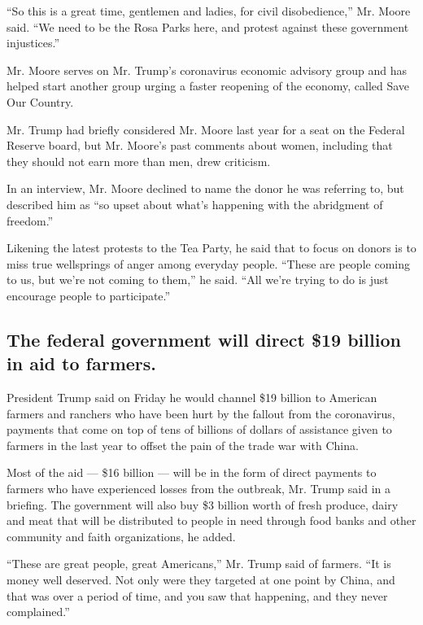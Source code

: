 ``So this is a great time, gentlemen and ladies, for civil
disobedience,'' Mr. Moore said. ``We need to be the Rosa Parks here, and
protest against these government injustices.''

Mr. Moore serves on Mr. Trump's coronavirus economic advisory group and
has helped start another group urging a faster reopening of the economy,
called Save Our Country.

Mr. Trump had briefly considered Mr. Moore last year for a seat on the
Federal Reserve board, but Mr. Moore's past comments about women,
including that they should not earn more than men, drew criticism.

In an interview, Mr. Moore declined to name the donor he was referring
to, but described him as ``so upset about what's happening with the
abridgment of freedom.''

Likening the latest protests to the Tea Party, he said that to focus on
donors is to miss true wellsprings of anger among everyday people.
``These are people coming to us, but we're not coming to them,'' he
said. ``All we're trying to do is just encourage people to
participate.''

\hypertarget{the-federal-government-will-direct-19-billion-in-aid-to-farmers}{%
\subsection{The federal government will direct \$19 billion in aid to
farmers.}\label{the-federal-government-will-direct-19-billion-in-aid-to-farmers}}

President Trump said on Friday he would channel \$19 billion to American
farmers and ranchers who have been hurt by the fallout from the
coronavirus, payments that come on top of tens of billions of dollars of
assistance given to farmers in the last year to offset the pain of the
trade war with China.

Most of the aid --- \$16 billion --- will be in the form of direct
payments to farmers who have experienced losses from the outbreak, Mr.
Trump said in a briefing. The government will also buy \$3 billion worth
of fresh produce, dairy and meat that will be distributed to people in
need through food banks and other community and faith organizations, he
added.

``These are great people, great Americans,'' Mr. Trump said of farmers.
``It is money well deserved. Not only were they targeted at one point by
China, and that was over a period of time, and you saw that happening,
and they never complained.''

